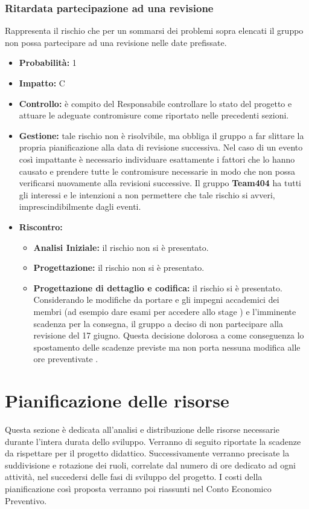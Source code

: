 \documentclass[a4paper,11pt]{article}
\begin{document}
		\subsubsection{Ritardata partecipazione ad una revisione}							Rappresenta il rischio che per un sommarsi dei problemi sopra elencati il gruppo non possa partecipare ad una revisione nelle date prefissate.
		\begin{itemize}
		\item \textbf{Probabilità:} 1
		\item \textbf{Impatto:} C
		\item \textbf{Controllo:} è compito del Responsabile controllare lo stato del progetto e attuare le adeguate contromisure come riportato nelle precedenti sezioni.
		\item \textbf{Gestione:} tale rischio non è risolvibile, ma obbliga il gruppo a far slittare la propria pianificazione alla data di revisione successiva. Nel caso di un evento così impattante è necessario individuare esattamente i fattori che lo hanno causato e prendere tutte le contromisure necessarie in modo che non possa verificarsi nuovamente alla revisioni successive. Il gruppo \textbf{Team404} ha tutti gli interessi e le intenzioni a non permettere che tale rischio si avveri, imprescindibilmente dagli eventi.
		\item \textbf{Riscontro:}
			\begin{itemize}
				\item\textbf{Analisi Iniziale:} il rischio non si è presentato.
				\item\textbf{Progettazione:} il rischio non si è presentato.
				\item\textbf{Progettazione di dettaglio e codifica:} il rischio si è presentato. Considerando le modifiche da portare e gli impegni accademici dei membri (ad esempio dare esami per accedere allo stage ) e l'imminente scadenza per la consegna, il gruppo a deciso di non partecipare alla revisione del 17 giugno. Questa decisione dolorosa a come conseguenza lo spostamento delle scadenze previste ma non porta nessuna modifica alle ore preventivate . 
			\end{itemize}
		\end{itemize}
	\pagebreak	
		
	\newpage
	\section{Pianificazione delle risorse}	
	Questa sezione è dedicata all'analisi e distribuzione delle risorse necessarie durante l'intera durata dello sviluppo. Verranno di seguito riportate la scadenze da rispettare per il progetto didattico. Successivamente verranno precisate la suddivisione e rotazione dei ruoli, correlate dal numero di ore dedicato ad ogni attività, nel succedersi delle fasi di sviluppo del progetto. I costi della pianificazione così proposta verranno poi riassunti nel Conto Economico Preventivo.
\end{document}
